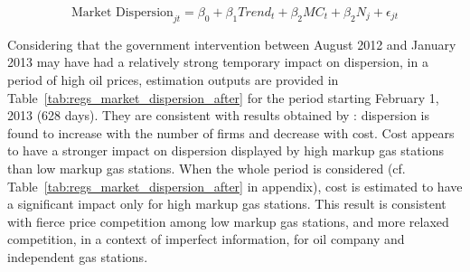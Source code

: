 \documentclass[english]{article}
\begin{document}
\begin{equation}
\text{Market Dispersion}_{jt}= \beta_0 + \beta_1 Trend_t + \beta_2 MC_t + \beta_2 N_j + \epsilon_{jt}
\end{equation}

Considering that the government intervention between August 2012 and January 2013 may have had a relatively strong temporary impact on dispersion, in a period of high oil prices, estimation outputs are provided in Table~\ref{tab:regs_market_dispersion_after} for the period starting February 1, 2013 (628 days). They are consistent with results obtained by \cite{TAP11}: dispersion is found to increase with the number of firms and decrease with cost. Cost appears to have a stronger impact on dispersion displayed by high markup gas stations than low markup gas stations. When the whole period is considered (cf. Table~\ref{tab:regs_market_dispersion_after} in appendix), cost is estimated to have a significant impact only for high markup gas stations. This result is consistent with fierce price competition among low markup gas stations, and more relaxed competition, in a context of imperfect information, for oil company and independent gas stations.
\end{document}
